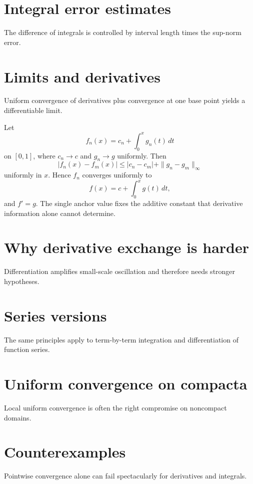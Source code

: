 \section{Integral error estimates}
The difference of integrals is controlled by interval length times the sup-norm error.

\section{Limits and derivatives}
Uniform convergence of derivatives plus convergence at one base point yields a differentiable limit.


\begin{example}\label{ex:ii12-expand-02}
Let
\[
f_n(x)=c_n+\int_0^x g_n(t)\,dt
\]
on \([0,1]\), where \(c_n\to c\) and \(g_n\to g\) uniformly. Then
\[
|f_n(x)-f_m(x)|
\le |c_n-c_m|+\|g_n-g_m\|_\infty
\]
uniformly in \(x\). Hence \(f_n\) converges uniformly to
\[
f(x)=c+\int_0^x g(t)\,dt,
\]
and \(f'=g\). The single anchor value fixes the additive constant that
derivative information alone cannot determine.
\end{example}
\section{Why derivative exchange is harder}
Differentiation amplifies small-scale oscillation and therefore needs stronger hypotheses.

\section{Series versions}
The same principles apply to term-by-term integration and differentiation of function series.

\section{Uniform convergence on compacta}
Local uniform convergence is often the right compromise on noncompact domains.

\section{Counterexamples}
Pointwise convergence alone can fail spectacularly for derivatives and integrals.



